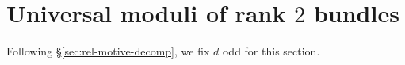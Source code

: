 \documentclass[11pt]{amsart}
\theoremstyle{definition}
\newcommand{\ri}{\rightarrow}
\newcommand{\jac}{\mathcal{J}}
\newcommand{\h}{\mathcal{H}}
\newcommand{\Q}{\mathbb{Q}}
\newcommand{\mC}{\mathcal{C}}
\newcommand{\T}{\Theta}
\begin{document}




\section{Universal moduli of rank $2$ bundles}\label{sec:motivic-decomp}
\noindent Following \S \ref{sec:rel-motive-decomp}, we fix $d$ odd for this section.
\end{document}
